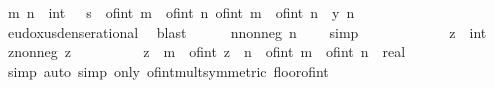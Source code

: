 \begin{isabellebody}
\ m\ n\ {\isacharcolon}{\kern0pt}{\isacharcolon}{\kern0pt}\ int\ \ {\isacharasterisk}{\kern0pt}{\isacharcolon}{\kern0pt}\ {\isachardoublequoteopen}s\ {\isacharless}{\kern0pt}\ {\isacharparenleft}{\kern0pt}of{\isacharunderscore}{\kern0pt}int\ m\ {\isacharslash}{\kern0pt}\ of{\isacharunderscore}{\kern0pt}int\ n{\isacharparenright}{\kern0pt}{\isachardoublequoteclose}\ {\isachardoublequoteopen}{\isacharparenleft}{\kern0pt}of{\isacharunderscore}{\kern0pt}int\ m\ {\isacharslash}{\kern0pt}\ of{\isacharunderscore}{\kern0pt}int\ n{\isacharparenright}{\kern0pt}\ {\isacharless}{\kern0pt}\ y{\isachardoublequoteclose}\ {\isachardoublequoteopen}n\ {\isachargreater}{\kern0pt}\ {}{\isachardoublequoteclose}\ \isamarkupfalse%
\ eudoxus{\isacharunderscore}{\kern0pt}dense{\isacharunderscore}{\kern0pt}rational\ \isamarkupfalse%
\ blast\isanewline
\ \ \ \ \isamarkupfalse%
\ n{\isacharunderscore}{\kern0pt}nonneg{\isacharcolon}{\kern0pt}\ {\isachardoublequoteopen}n\ {\isasymge}\ {}{\isachardoublequoteclose}\ \isamarkupfalse%
\ simp\isanewline
\ \ \ \ \isacommand{{\isacharbraceleft}{\kern0pt}}\isamarkupfalse%
\isanewline
\ \ \ \ \ \ \isamarkupfalse%
\ z\ {\isacharcolon}{\kern0pt}{\isacharcolon}{\kern0pt}\ int\ \isamarkupfalse%
\ z{\isacharunderscore}{\kern0pt}nonneg{\isacharcolon}{\kern0pt}\ {\isachardoublequoteopen}z\ {\isasymge}\ {}{\isachardoublequoteclose}\isanewline
\ \ \ \ \ \ \isamarkupfalse%
\ {\isachardoublequoteopen}z\ {\isacharasterisk}{\kern0pt}\ m\ {\isacharequal}{\kern0pt}\ {\isasymlfloor}of{\isacharunderscore}{\kern0pt}int\ {\isacharparenleft}{\kern0pt}z\ {\isacharasterisk}{\kern0pt}\ n{\isacharparenright}{\kern0pt}\ {\isacharasterisk}{\kern0pt}\ {\isacharparenleft}{\kern0pt}of{\isacharunderscore}{\kern0pt}int\ m\ {\isacharslash}{\kern0pt}\ of{\isacharunderscore}{\kern0pt}int\ n{\isacharparenright}{\kern0pt}\ {\isacharcolon}{\kern0pt}{\isacharcolon}{\kern0pt}\ real{\isasymrfloor}{\isachardoublequoteclose}\ \isamarkupfalse%
\ {\isacharasterisk}{\kern0pt}{\isacharparenleft}{\kern0pt}{}{\isacharparenright}{\kern0pt}\ \isamarkupfalse%
\ simp\ {\isacharparenleft}{\kern0pt}auto\ simp\ only{\isacharcolon}{\kern0pt}\ of{\isacharunderscore}{\kern0pt}int{\isacharunderscore}{\kern0pt}mult{\isacharbrackleft}{\kern0pt}symmetric{\isacharbrackright}{\kern0pt}\ floor{\isacharunderscore}{\kern0pt}of{\isacharunderscore}{\kern0pt}int{\isacharparenright}{\kern0pt}\isanewline

\end{isabellebody}

